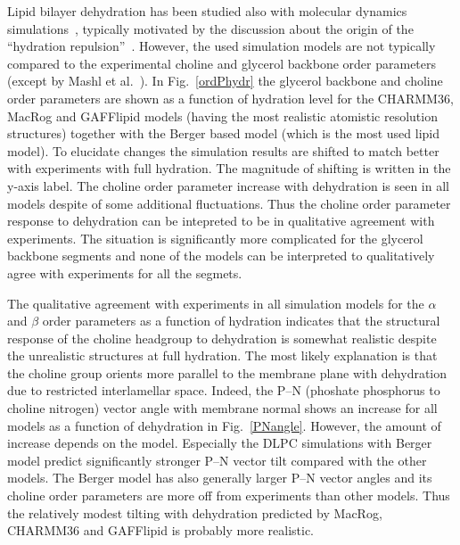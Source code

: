 \documentclass[journal=jacsat,manuscript=article]{achemso}
\begin{document}
Lipid bilayer dehydration has been studied also with molecular dynamics simulations~\cite{mashl01,pertsin05,pertsin07,eun09,eun10,schneck12},
typically motivated by the  discussion about the origin of the ``hydration repulsion''~\cite{israelachvili,israelachvili96,sparr11}.
However, the used simulation models are not typically compared to the experimental choline and glycerol backbone
order parameters (except by Mashl et al.~\cite{mashl01}).
In Fig.~\ref{ordPhydr} the glycerol backbone and choline order parameters are shown as a function of hydration level for the CHARMM36, 
MacRog and GAFFlipid models (having the most realistic atomistic resolution structures) together with the Berger based model 
(which is the most used lipid model). 
To elucidate changes the simulation results are shifted to match better with experiments with full hydration.
The magnitude of shifting is written in the y-axis label.
The choline order parameter increase with dehydration is seen in all
models despite of some additional fluctuations. Thus the choline order parameter response to dehydration can be
intepreted to be in qualitative agreement with experiments.
The situation is significantly more complicated for the glycerol backbone segments 
and none of the models can be interpreted to qualitatively agree with experiments
for all the segmets.

The qualitative agreement with experiments in all simulation models for the $\alpha$ and $\beta$ order parameters  
as a function of hydration indicates that the structural response of the choline headgroup to dehydration is somewhat realistic
despite the unrealistic structures at full hydration. 
The most likely explanation is that the choline group
orients more parallel to the membrane plane with dehydration due to restricted interlamellar space. 
Indeed, the P--N (phoshate phosphorus to choline nitrogen) vector angle with membrane normal shows an increase for
all models as a function of dehydration in Fig.~\ref{PNangle}.
However, the amount of increase depends on the model. Especially the DLPC simulations with Berger model
predict significantly stronger P--N vector tilt compared with the other models. The Berger model
has also generally larger P--N vector angles and its choline order parameters are more off from
experiments than other models. Thus the relatively modest tilting with dehydration
predicted by MacRog, CHARMM36 and GAFFlipid is probably more realistic.
\end{document}
